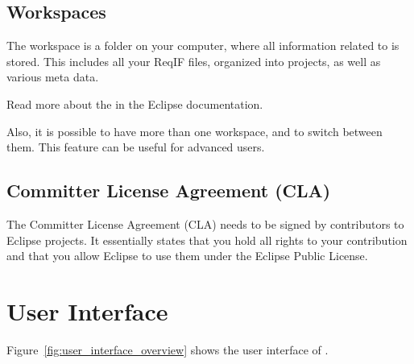 \subsection{Workspaces}
\label{sec:workspaces}

The workspace is a folder on your computer, where all information related to \pror{} is stored.  This includes all your ReqIF files, organized into projects, as well as various meta data.

\begin{info}
Read more about the  in the Eclipse documentation.

Also, it is possible to have more than one workspace, and to switch between them.  This feature can be useful for advanced users.
\end{info}

\subsection{Committer License Agreement (CLA)}

The Committer License Agreement (CLA) needs to be signed by contributors to Eclipse projects.  It essentially states that you hold all rights to your contribution and that you allow Eclipse to use them under the Eclipse Public License.

\section{\pror{} User Interface}

Figure~\ref{fig:user_interface_overview} shows the user interface of \pror{}.

